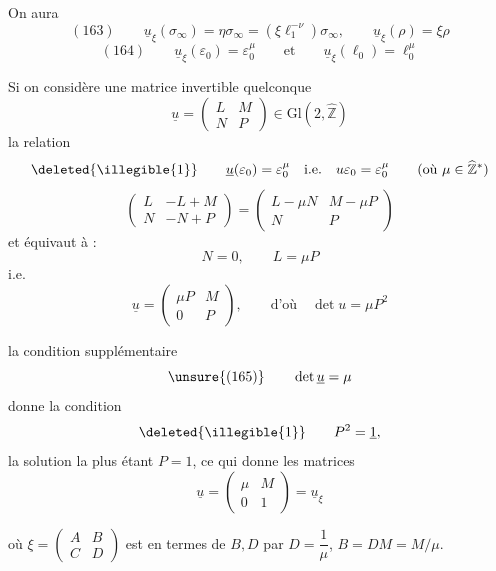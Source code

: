 
 On aura
\[
(163)\qquad
\underline u_\xi(\sigma_\infty)
=\eta\sigma_\infty
=(\xi \ell_1^{-\nu})\sigma_\infty,
\qquad
\underline u_\xi(\rho)=\xi\rho
\]
\[
(164)\qquad
\underline u_\xi(\varepsilon_0)=\varepsilon_0^\mu
\qquad\text{et}\qquad
\underline u_\xi(\ell_0)=\ell_0^\mu
\]


Si on considère une matrice invertible quelconque
\[
\underline u=\begin{pmatrix}L&M\\N&P\end{pmatrix}
\in\mathrm{Gl}(2,\widehat{\mathbb Z})
\]
la relation
\[
\deleted{\illegible{1}}\qquad
\underline u(\varepsilon_0)=\varepsilon_0^\mu
\quad\text{i.e.}\quad
u\varepsilon_0=\varepsilon_0^\mu
\qquad(\text{où }\mu\in\widehat{\mathbb Z}^{*})
\]
\[
\begin{pmatrix}L&-L+M\\N&-N+P\end{pmatrix}
=\begin{pmatrix}L-\mu N&M-\mu P\\N&P\end{pmatrix}
\]
et équivaut à : 
\[
N=0,\qquad L=\mu P
\]
i.e.
\[
\underline u=\begin{pmatrix}\mu P&M\\0&P\end{pmatrix},
\qquad\text{d'où}\quad\det u=\mu P^2
\]

la condition supplémentaire
\[
\unsure{(165)}\qquad \det\underline u=\mu
\]
donne la condition
\[
\deleted{\illegible{1}}\qquad P^2=\underline 1,
\]
la solution la plus  étant $P=1$,
ce qui donne  les matrices
\[
\underline u=\begin{pmatrix}\mu&M\\0&1\end{pmatrix}
=\underline u_\xi
\]


où $\xi=\begin{pmatrix}A&B\\C&D\end{pmatrix}$
 est  en termes de
$B,D$ par $D=\dfrac1\mu$, $B=DM=M/\mu$.

